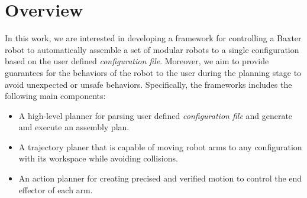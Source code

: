 \section{Overview}\label{overview}
In this work, we are interested in developing a framework for controlling a Baxter robot to automatically assemble a set of modular robots to a single configuration based on the user defined {\it configuration file}.
Moreover, we aim to provide guarantees for the behaviors of the robot to the user during the planning stage to avoid unexpected or unsafe behaviors.
Specifically, the frameworks includes the following main components:
\begin{itemize}
\item A high-level planner for parsing user defined {\it configuration file} and generate and execute an assembly plan. 
\item A trajectory planer that is capable of moving robot arms to any configuration with its workspace while avoiding collisions.
\item An action planner for creating precised and verified motion to control the end effector of each arm.
\end{itemize}

